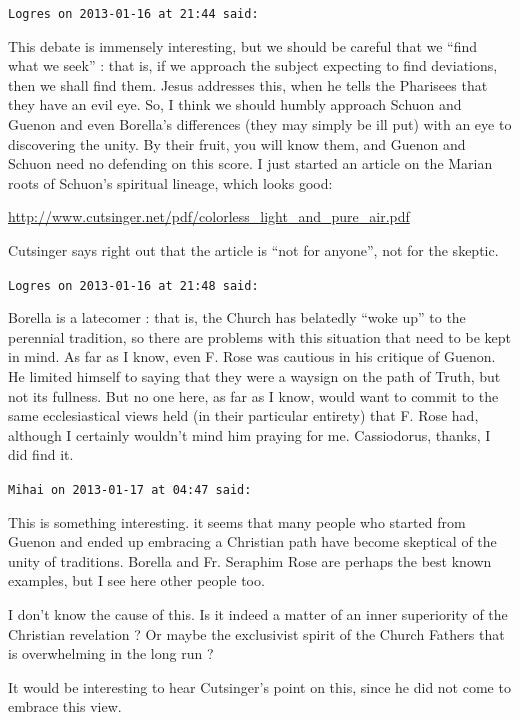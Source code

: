 \begin{footnotesize}
\begin{sffamily}
\hfill

\texttt{Logres on 2013-01-16 at 21:44 said:}

This debate is immensely interesting, but we should be careful that we ``find what we seek'' : that is, if we approach the subject expecting to find deviations, then we shall find them. Jesus addresses this, when he tells the Pharisees that they have an evil eye. So, I think we should humbly approach Schuon and Guenon and even Borella's differences (they may simply be ill put) with an eye to discovering the unity. By their fruit, you will know them, and Guenon and Schuon need no defending on this score. I just started an article on the Marian roots of Schuon's spiritual lineage, which looks good:

\url{http://www.cutsinger.net/pdf/colorless\_light\_and\_pure\_air.pdf}

Cutsinger says right out that the article is ``not for anyone'', not for the skeptic.

\hfill

\texttt{Logres on 2013-01-16 at 21:48 said:}

Borella is a latecomer : that is, the Church has belatedly ``woke up'' to the perennial tradition, so there are problems with this situation that need to be kept in mind. As far as I know, even F. Rose was cautious in his critique of Guenon. He limited himself to saying that they were a waysign on the path of Truth, but not its fullness. But no one here, as far as I know, would want to commit to the same ecclesiastical views held (in their particular entirety) that F. Rose had, although I certainly wouldn't mind him praying for me. Cassiodorus, thanks, I did find it.

\hfill

\texttt{Mihai on 2013-01-17 at 04:47 said:}

This is something interesting. it seems that many people who started from Guenon and ended up embracing a Christian path have become skeptical of the unity of traditions. Borella and Fr. Seraphim Rose are perhaps the best known examples, but I see here other people too.

I don't know the cause of this. Is it indeed a matter of an inner superiority of the Christian revelation ? Or maybe the exclusivist spirit of the Church Fathers that is overwhelming in the long run ?

It would be interesting to hear Cutsinger's point on this, since he did not come to embrace this view.

\hfill


\end{sffamily}
\end{footnotesize}

